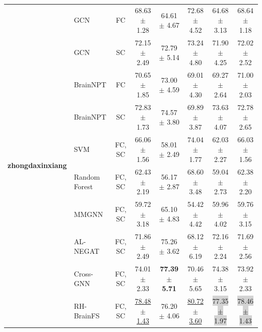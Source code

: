 \begin{table}[!htbp]
{\begin{tabular}{clcccccc}
        \midrule\midrule
        \multirow{12}{*}{\Large{\textbf{zhongdaxinxiang}}}
        & GCN & FC & 68.63 $\pm$ \scriptsize{1.28} & 64.61 $\pm$ \scriptsize{4.67} & 72.68 $\pm$ \scriptsize{4.52} & 64.68 $\pm$ \scriptsize{3.13} & 68.64 $\pm$ \scriptsize{1.18}
        \\
        & GCN & SC & 72.15 $\pm$ \scriptsize{2.49} & 72.79 $\pm$ \scriptsize{5.14} & 73.24 $\pm$ \scriptsize{4.80} & 71.90 $\pm$ \scriptsize{4.25} & 72.02 $\pm$ \scriptsize{2.52}
        \\
        & BrainNPT & FC & 70.65 $\pm$ \scriptsize{1.85} & 73.00 $\pm$ \scriptsize{4.59} & 69.01 $\pm$ \scriptsize{4.30} & 69.27 $\pm$ \scriptsize{2.64} & 71.00 $\pm$ \scriptsize{2.03}
        \\
        & BrainNPT & SC & 72.83 $\pm$ \scriptsize{1.73} & 74.57 $\pm$ \scriptsize{3.80} & 69.89 $\pm$ \scriptsize{3.87} & 73.63 $\pm$ \scriptsize{4.07} & 72.78 $\pm$ \scriptsize{2.65}
        \\
        \cmidrule{2-8}
        & SVM & FC, SC &  66.06 $\pm$ \scriptsize{1.56} & 58.01 $\pm$ \scriptsize{2.49} & 74.04 $\pm$ \scriptsize{1.77} & 62.03 $\pm$ \scriptsize{2.27} & 66.03 $\pm$ \scriptsize{1.56} 
        \\
        & Random Forest & FC, SC & 62.43 $\pm$ \scriptsize{2.19} & 56.17 $\pm$ \scriptsize{2.87} & 68.60 $\pm$ \scriptsize{3.48} & 59.04 $\pm$ \scriptsize{2.73} & 62.38 $\pm$ \scriptsize{2.20}
        \\
        & MMGNN & FC, SC & 59.72 $\pm$ \scriptsize{3.18} & 65.10 $\pm$ \scriptsize{4.83} & 54.42 $\pm$ \scriptsize{4.42} & 59.96 $\pm$ \scriptsize{4.02} & 59.76 $\pm$ \scriptsize{3.15}
        \\
        & AL-NEGAT & FC, SC & 71.86 $\pm$ \scriptsize{2.49} & 75.26 $\pm$ \scriptsize{3.62} & 68.12 $\pm$ \scriptsize{6.19} & 72.16 $\pm$ \scriptsize{2.24} & 71.69 $\pm$ \scriptsize{2.56}
        \\
        & Cross-GNN & FC, SC & 74.01 $\pm$ \scriptsize{2.33} & \textbf{77.39 $\pm$ \scriptsize{5.71}} & 70.46 $\pm$ \scriptsize{5.65} & 74.38 $\pm$ \scriptsize{3.15} & 73.92 $\pm$ \scriptsize{2.33}
        \\
        & RH-BrainFS & FC, SC & \underline{78.48 $\pm$ \scriptsize{1.43}} & 76.20 $\pm$ \scriptsize{4.06} & \underline{80.72 $\pm$ \scriptsize{3.60}} & \colorbox{lightgray}{77.35 $\pm$ \scriptsize{1.97}} & \colorbox{lightgray}{78.46 $\pm$ \scriptsize{1.43}}

\end{tabular}}
\end{table}
